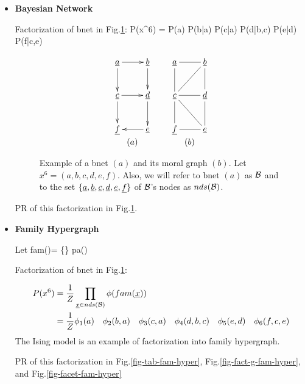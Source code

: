 \begin{itemize}
\item {\bf Bayesian Network}

Factorization  of bnet in Fig.\ref{fig-2-boxes-bnet}:
\beq
P(x^6)
=
P(a)
\quad P(b|a)
\quad P(c|a)
\quad P(d|b,c)
\quad P(e|d)
\quad P(f|c,e)
\eeq

\begin{figure}[h!]
$$
\begin{array}{ccc}
\xymatrix{
\rva\ar[r]\ar[d]
&{\rvb}\ar[d]
\\
{\rvc}\ar[r]\ar[d]
&{\rvd}\ar[d]
\\
\rvf
&\rve\ar[l]
}
&&
\xymatrix{
\rva
\ar@{-}[r]
\ar@{-}[d]
&{\rvb}
\ar@{-}[d]
\ar@{-}[dl]
\\
{\rvc}
\ar@{-}[r]
\ar@{-}[d]
\ar@{-}[dr]
&{\rvd}
\ar@{-}[d]
\\
\rvf
&\rve
\ar@{-}[l]
}
\\
(a)
&& (b)
\end{array}
$$
\caption{Example of a bnet $(a)$ and
its moral graph $(b)$. Let
$x^6 = (a,b,c,d,e, f)$.
Also, we will refer to bnet $(a)$ as ${\cal B}$ and to the set
$\{\rva, \rvb, \rvc, \rvd, \rve, \rvf\}$ of ${\cal B}$'s nodes as $nds({\cal B})$.}
\label{fig-2-boxes-bnet}
\end{figure}

PR of this factorization in Fig.\ref{fig-2-boxes-bnet}.

\item {\bf Family Hypergraph}

Let
\beq
fam(\rvx)= \{\rvx\}
\cup pa(\rvx)
\eeq

Factorization  of bnet in Fig.\ref{fig-2-boxes-bnet}:


\begin{align}
P(x^6)&=
\frac{1}{Z}
\prod_{\rvx\in nds(\calb)}
\phi(fam(\rvx))
\\
&=
\frac{1}{Z}
\phi_1(a)
\quad \phi_2(b,a)
\quad \phi_3(c,a)
\quad \phi_4(d, b, c)
\quad \phi_5(e, d)
\quad \phi_6(f, c, e)
\end{align}
The Ising model is an example of
factorization into family hypergraph.

PR of this factorization in Fig.\ref{fig-tab-fam-hyper}, Fig.\ref{fig-fact-g-fam-hyper}, and
Fig.\ref{fig-facet-fam-hyper}



\end{itemize}
